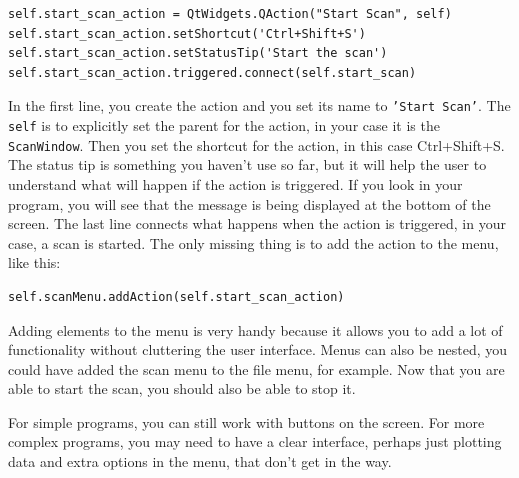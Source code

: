 \begin{verbatim}
self.start_scan_action = QtWidgets.QAction("Start Scan", self)
self.start_scan_action.setShortcut('Ctrl+Shift+S')
self.start_scan_action.setStatusTip('Start the scan')
self.start_scan_action.triggered.connect(self.start_scan)
\end{verbatim}

In the first line, you create the action and you set its name to \texttt{'Start
Scan'}. The \texttt{self} is to explicitly set the parent for the
action, in your case it is the \texttt{ScanWindow}. Then you set the
shortcut for the action, in this case Ctrl+Shift+S. The status tip is
something you haven't use so far, but it will help the user to
understand what will happen if the action is triggered. If you look in
your program, you will see that the message is being displayed at the
bottom of the screen. The last line connects what happens when the
action is triggered, in your case, a scan is started. The only missing
thing is to add the action to the menu, like this:

\begin{verbatim}
self.scanMenu.addAction(self.start_scan_action)
\end{verbatim}


Adding elements to the menu is very handy because it allows you to add a
lot of functionality without cluttering the user interface. Menus can
also be nested, you could have added the scan menu to the file menu, for
example. Now that you are able to start the scan, you should also be
able to stop it.


For simple programs, you can still work with buttons on the screen. For
more complex programs, you may need to have a clear interface, perhaps
just plotting data and extra options in the menu, that don't get in
the way.

